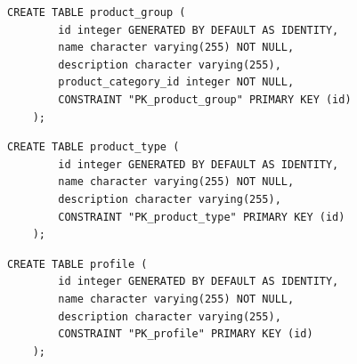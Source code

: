 \begin{quadro}[H]
	\caption[Script SQL --- Tabela \texttt{product\_group}]{Script SQL --- Tabela \texttt{product\_group}}
	\label{quadro:script-product-group}
	
	\begin{minipage}{0.96\textwidth}
		\begin{lstlisting}[style=academic-sql]
	CREATE TABLE product_group (
		id integer GENERATED BY DEFAULT AS IDENTITY,
		name character varying(255) NOT NULL,
		description character varying(255),
		product_category_id integer NOT NULL,
		CONSTRAINT "PK_product_group" PRIMARY KEY (id)
	);
		\end{lstlisting}
	\end{minipage}
	
\end{quadro}

\begin{quadro}[H]
	\caption[Script SQL --- Tabela \texttt{product\_type}]{Script SQL --- Tabela \texttt{product\_type}}
	\label{quadro:script-product-type}
	
	\begin{minipage}{0.96\textwidth}
		\begin{lstlisting}[style=academic-sql]
	CREATE TABLE product_type (
		id integer GENERATED BY DEFAULT AS IDENTITY,
		name character varying(255) NOT NULL,
		description character varying(255),
		CONSTRAINT "PK_product_type" PRIMARY KEY (id)
	);
		\end{lstlisting}
	\end{minipage}
	
\end{quadro}

\begin{quadro}[H]
	\caption[Script SQL --- Tabela \texttt{profile}]{Script SQL --- Tabela \texttt{profile}}
	\label{quadro:script-profile}
	
	\begin{minipage}{0.96\textwidth}
		\begin{lstlisting}[style=academic-sql]
	CREATE TABLE profile (
		id integer GENERATED BY DEFAULT AS IDENTITY,
		name character varying(255) NOT NULL,
		description character varying(255),
		CONSTRAINT "PK_profile" PRIMARY KEY (id)
	);
		\end{lstlisting}
	\end{minipage}
	
\end{quadro}

